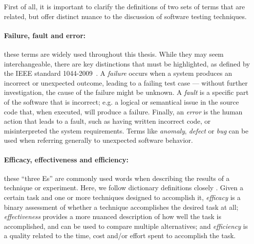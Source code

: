 
First of all, it is important to clarify the definitions of two sets of terms that are related, but offer distinct nuance to the discussion of software testing techniques.

\paragraph{Failure, fault and error: } these terms are widely used throughout this thesis.
While they may seem interchangeable, there are key distinctions that must be highlighted, as defined by the IEEE standard 1044-2009~\cite{IEEE1044-2009}.
A \textit{failure} occurs when a system produces an incorrect or unexpected outcome, leading to a failing test case --- without further investigation, the cause of the failure might be unknown.
A \textit{fault} is a specific part of the software that is incorrect; e.g. a logical or semantical issue in the source code that, when executed, will produce a failure.
Finally, an \textit{error} is the human action that leads to a fault, such as having written incorrect code, or misinterpreted the system requirements.
Terms like \textit{anomaly}, \textit{defect} or \textit{bug} can be used when referring generally to unexpected software behavior.

\paragraph{Efficacy, effectiveness and efficiency: } these ``three Es'' are commonly used words when describing the results of a technique or experiment.
Here, we follow dictionary definitions closely \cite{dictionary_eff}.
Given a certain task and one or more techniques designed to accomplish it,
\textit{efficacy} is a binary assessment of whether a technique accomplishes the desired task at all;
\textit{effectiveness} provides a more nuanced description of how well the task is accomplished, and can be used to compare multiple alternatives; and
\textit{efficiency} is a quality related to the time, cost and/or effort spent to accomplish the task.